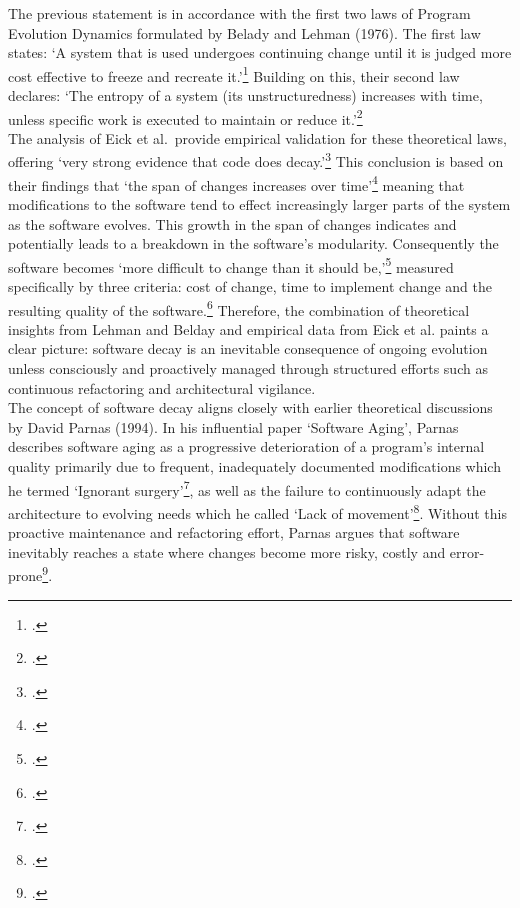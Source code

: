 The previous statement is in accordance with the first two laws of Program Evolution Dynamics formulated by Belady and Lehman (1976).
The first law states: `A system that is used undergoes continuing change until it is judged more cost effective to freeze and recreate it.'\footcite[228]{beladyModelLargeProgram1976}
Building on this, their second law declares: `The entropy of a system (its unstructuredness) increases with time, unless specific work is executed to maintain or reduce it.'\footcite[228]{beladyModelLargeProgram1976}\\

The analysis of Eick et al.\ provide empirical validation for these theoretical laws, offering `very strong evidence that code does decay.'\footcite[7]{eickDoesCodeDecay2001}
This conclusion is based on their findings that `the span of changes increases over time'\footcite[7]{eickDoesCodeDecay2001} meaning that modifications to the software tend to effect increasingly larger parts of the system as the software evolves. This growth in the span of changes indicates and potentially leads to
a breakdown in the software's modularity. Consequently the software becomes `more difficult to change than it should be,'\footcite[3]{eickDoesCodeDecay2001} measured specifically by three criteria: cost of change, time to implement change and the resulting quality of the software.\footcite[3]{eickDoesCodeDecay2001}
Therefore, the combination of theoretical insights from Lehman and Belday and empirical data from Eick et al. paints a clear picture: software decay is an inevitable consequence of ongoing evolution unless consciously and proactively managed through structured efforts such as continuous refactoring and architectural vigilance.\\

The concept of software decay aligns closely with earlier theoretical discussions by David Parnas (1994). In his influential paper `Software Aging', Parnas describes software aging as a progressive deterioration of a program's internal quality primarily due to frequent, 
inadequately documented modifications which he termed `Ignorant surgery'\footcite[280]{296790}, as well as the failure to continuously adapt the architecture to evolving needs which he called `Lack of movement'\footcite[280]{296790}.
Without this proactive maintenance and refactoring effort, Parnas argues that software inevitably reaches a state where changes become more risky, costly and error-prone\footcite[280-281]{296790}.

